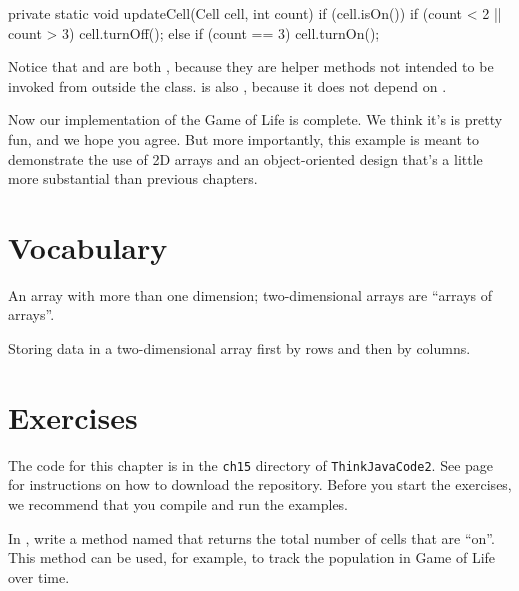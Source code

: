\begin{code}
private static void updateCell(Cell cell, int count) {
    if (cell.isOn()) {
        if (count < 2 || count > 3) {
            cell.turnOff();
        }
    } else {
        if (count == 3) {
            cell.turnOn();
        }
    }
}
\end{code}

Notice that  and  are both , because they are helper methods not intended to be invoked from outside the class.
 is also , because it does not depend on .

Now our implementation of the Game of Life is complete.
We think it's is pretty fun, and we hope you agree.
But more importantly, this example is meant to demonstrate the use of 2D arrays and an object-oriented design that's a little more substantial than previous chapters.



\section{Vocabulary}

\begin{description}

An array with more than one dimension; two-dimensional arrays are ``arrays of arrays''.

Storing data in a two-dimensional array first by rows and then by columns.

\end{description}


\section{Exercises}

The code for this chapter is in the {\tt ch15} directory of {\tt ThinkJavaCode2}.
See page~\pageref{code} for instructions on how to download the repository.
Before you start the exercises, we recommend that you compile and run the examples.


\begin{exercise}
In , write a method named  that returns the total number of cells that are ``on''.
This method can be used, for example, to track the population in Game of Life over time.
\end{exercise}


